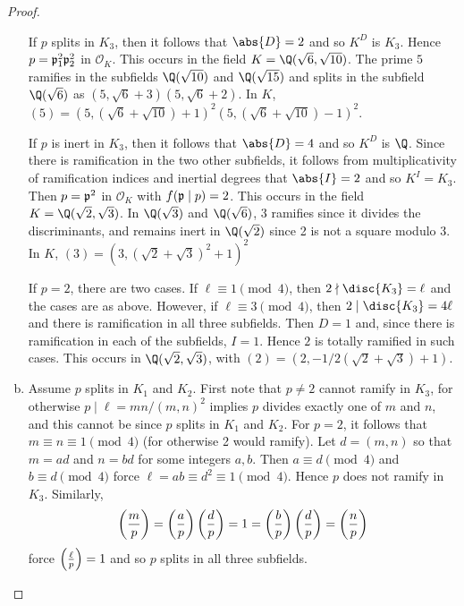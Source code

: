\documentclass[10pt]{amsart}
\begin{document}
\begin{thm}
\begin{proof}
\begin{enumerate}[(a)]
        If $p$ splits in $K_3$, then it follows that $\abs{D} = 2$ and so $K^D$ is $K_3$.
        Hence $p = \mathfrak{p}_1^2\mathfrak{p}_2^2$ in $\mathcal{O}_K$.
        This occurs in the field $K = \Q(\sqrt{6}, \sqrt{10})$.
        The prime $5$ ramifies in the subfields $\Q(\sqrt{10})$ and $\Q(\sqrt{15})$ and splits in the subfield $\Q(\sqrt{6})$ as $(5, \sqrt{6} + 3)(5, \sqrt{6} + 2)$.
        In $K$, $(5) = (5, (\sqrt{6} + \sqrt{10}) + 1)^2(5, (\sqrt{6} + \sqrt{10}) - 1)^2$.
        
        If $p$ is inert in $K_3$, then it follows that $\abs{D} = 4$ and so $K^D$ is $\Q$.
        Since there is ramification in the two other subfields, it follows from multiplicativity of ramification indices and inertial degrees that $\abs{I} = 2$ and so $K^I = K_3$.
        Then $p = \mathfrak{p}^2$ in $\mathcal{O}_K$ with $f(\mathfrak{p} \mid p) = 2$.
        This occurs in the field $K = \Q(\sqrt{2}, \sqrt{3})$.
        In $\Q(\sqrt{3})$ and $\Q(\sqrt{6})$, 3 ramifies since it divides the discriminants, and remains inert in $\Q(\sqrt{2})$ since 2 is not a square modulo 3.
        In $K$, $(3) = (3, (\sqrt{2} + \sqrt{3})^2 + 1)^2$
        
        If $p = 2$, there are two cases.
        If $\ell \equiv 1 \pmod{4}$, then $2 \nmid \disc{K_3} = \ell$ and the cases are as above.
        However, if $\ell \equiv 3 \pmod{4}$, then $2 \mid \disc{K_3} = 4\ell$ and there is ramification in all three subfields.
        Then $D = 1$ and, since there is ramification in each of the subfields, $I = 1$.
        Hence $2$ is totally ramified in such cases.
        This occurs in $\Q(\sqrt{2}, \sqrt{3})$, with $(2) = (2, -1/2(\sqrt{2} + \sqrt{3}) + 1)$.
      \item
        Assume $p$ splits in $K_1$ and $K_2$.
        First note that $p \neq 2$ cannot ramify in $K_3$, for otherwise $p \mid \ell = mn / (m,n)^2$ implies $p$ divides exactly one of $m$ and $n$, and this cannot be since $p$ splits in $K_1$ and $K_2$.
        For $p = 2$, it follows that $m \equiv n \equiv 1 \pmod{4}$ (for otherwise 2 would ramify).
        Let $d = (m,n)$ so that $m = ad$ and $n = bd$ for some integers $a,b$.
        Then $a \equiv d \pmod{4}$ and $b \equiv d \pmod{4}$ force $\ell = ab \equiv d^2 \equiv 1 \pmod{4}$.
        Hence $p$ does not ramify in $K_3$.
        Similarly, $$\left(\frac{m}{p}\right) = \left(\frac{a}{p}\right)\left(\frac{d}{p}\right) = 1 = \left(\frac{b}{p}\right)\left(\frac{d}{p}\right)= \left(\frac{n}{p}\right)$$
        force $\left(\frac{\ell}{p}\right) = 1$ and so $p$ splits in all three subfields.
        

\end{enumerate}
\end{proof}
\end{thm}
\end{document}
